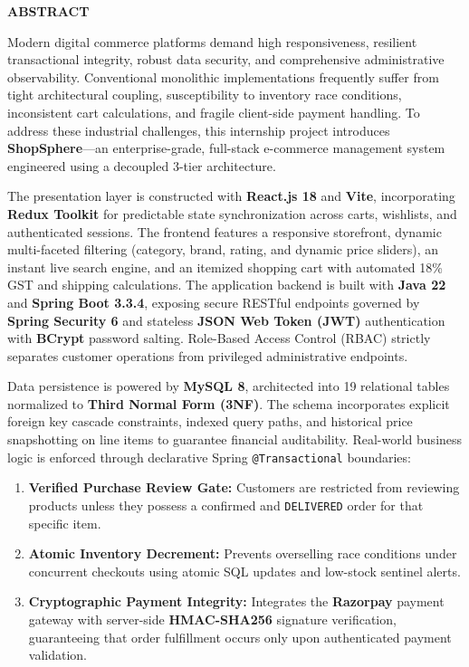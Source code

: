 \newpage
\thispagestyle{fancy}
\begin{center}
    {\fontsize{16}{20}\selectfont \textbf{ABSTRACT}}\\[0.8cm]
\end{center}

\noindent Modern digital commerce platforms demand high responsiveness, resilient transactional integrity, robust data security, and comprehensive administrative observability. Conventional monolithic implementations frequently suffer from tight architectural coupling, susceptibility to inventory race conditions, inconsistent cart calculations, and fragile client-side payment handling. To address these industrial challenges, this internship project introduces \textbf{ShopSphere}—an enterprise-grade, full-stack e-commerce management system engineered using a decoupled 3-tier architecture.

\vspace{0.3cm}

\noindent The presentation layer is constructed with \textbf{React.js 18} and \textbf{Vite}, incorporating \textbf{Redux Toolkit} for predictable state synchronization across carts, wishlists, and authenticated sessions. The frontend features a responsive storefront, dynamic multi-faceted filtering (category, brand, rating, and dynamic price sliders), an instant live search engine, and an itemized shopping cart with automated 18\% GST and shipping calculations. The application backend is built with \textbf{Java 22} and \textbf{Spring Boot 3.3.4}, exposing secure RESTful endpoints governed by \textbf{Spring Security 6} and stateless \textbf{JSON Web Token (JWT)} authentication with \textbf{BCrypt} password salting. Role-Based Access Control (RBAC) strictly separates customer operations from privileged administrative endpoints.

\vspace{0.3cm}

\noindent Data persistence is powered by \textbf{MySQL 8}, architected into 19 relational tables normalized to \textbf{Third Normal Form (3NF)}. The schema incorporates explicit foreign key cascade constraints, indexed query paths, and historical price snapshotting on line items to guarantee financial auditability. Real-world business logic is enforced through declarative Spring \texttt{@Transactional} boundaries:
\begin{enumerate}[leftmargin=2.0em, topsep=2pt, parsep=0pt]
    \item \textbf{Verified Purchase Review Gate:} Customers are restricted from reviewing products unless they possess a confirmed and \texttt{DELIVERED} order for that specific item.
    \item \textbf{Atomic Inventory Decrement:} Prevents overselling race conditions under concurrent checkouts using atomic SQL updates and low-stock sentinel alerts.
    \item \textbf{Cryptographic Payment Integrity:} Integrates the \textbf{Razorpay} payment gateway with server-side \textbf{HMAC-SHA256} signature verification, guaranteeing that order fulfillment occurs only upon authenticated payment validation.
\end{enumerate}

